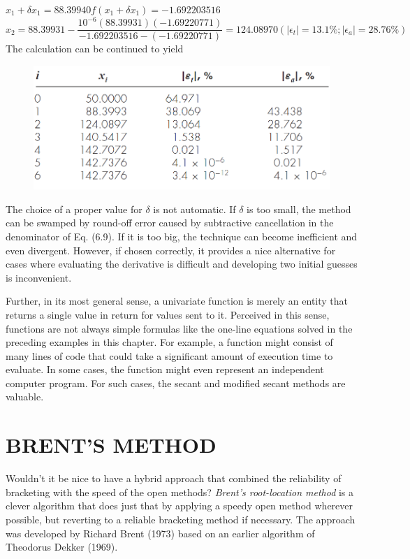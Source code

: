 \documentclass[../main.tex]{subfiles}
\begin{document}
\begin{example}
    $x_1 + \delta x_1 = 88.39940$\hspace{11mm}$f(x_1+ \delta x_1) = -1.692203516$\\

    $x_2 = 88.39931 - \dfrac{10^{-6}(88.39931)(-1.69220771)}{-1.692203516 - (-1.69220771)} =
    124.08970(\left\lvert \epsilon_t \right\rvert = 13.1\%; \left\lvert \epsilon_a \right\rvert = 28.76\%)$\\

    \noindent The calculation can be continued to yield\\

    \begin{figure}[h]
        \includegraphics[width=0.55\linewidth]{./images/example_6_5_1}
    \end{figure}
    
    The choice of a proper value for $\delta$ is not automatic. If $\delta$ is too small, the method can be
    swamped by round-off error caused by subtractive cancellation in the denominator of
    Eq. (6.9). If it is too big, the technique can become inefficient and even divergent. However,
    if chosen correctly, it provides a nice alternative for cases where evaluating the
    derivative is difficult and developing two initial guesses is inconvenient.
    
    Further, in its most general sense, a univariate function is merely an entity that returns
    a single value in return for values sent to it. Perceived in this sense, functions are not
    always simple formulas like the one-line equations solved in the preceding examples in this
    chapter. For example, a function might consist of many lines of code that could take a significant
    amount of execution time to evaluate. In some cases, the function might even represent
    an independent computer program. For such cases, the secant and modified secant
    methods are valuable.\\
\end{example}
\newpage

\section[BRENT'S METHOD]{BRENT'S METHOD}
\noindent Wouldn't it be nice to have a hybrid approach that combined the reliability of bracketing
with the speed of the open methods? \emph{Brent's root-location method} is a clever algorithm that
does just that by applying a speedy open method wherever possible, but reverting to a reliable
bracketing method if necessary. The approach was developed by Richard Brent (1973)
based on an earlier algorithm of Theodorus Dekker (1969).
\end{document}
